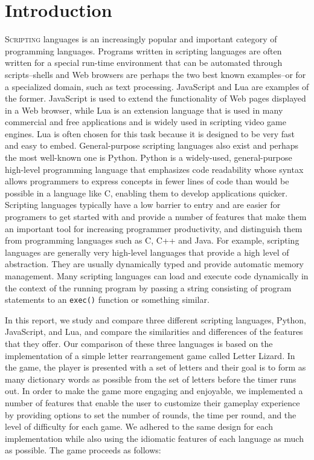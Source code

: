 \section{Introduction}

\lettrine[nindent=0em,lines=3]{S}{cripting} languages is an increasingly popular and important
category of programming languages. Programs written in scripting languages are often written for
a special run-time environment that can be automated through scripts--shells and Web browsers
are perhaps the two best known examples--or for a specialized domain, such as text processing.
JavaScript and Lua are examples of the former. JavaScript is used to extend the functionality
of Web pages displayed in a Web browser, while Lua is an extension language that is used in many 
commercial and free applications and is widely used in scripting video game engines. Lua is
often chosen for this task because it is designed to be very fast and easy to embed.
General-purpose scripting languages also exist and perhaps the most well-known one is Python.
Python is a widely-used, general-purpose high-level programming language that emphasizes code
readability whose syntax allows programmers to express concepts in fewer lines of code than would be 
possible in a language like C, enabling them to develop applications quicker. 
Scripting languages typically have a low barrier to entry and are easier for programers to 
get started with and provide a number of features that make them an important tool for increasing 
programmer productivity, and distinguish them from programming languages such as C, C++ and Java. 
For example, scripting languages are generally very high-level languages that provide a high level of 
abstraction. They are usually dynamically typed and provide automatic memory management. Many
scripting languages can load and execute code dynamically in the context of the running program
by passing a string consisting of program statements to an \texttt{exec()} function or something
similar.

In this report, we study and compare three different scripting languages, Python,
JavaScript, and Lua, and compare the similarities and differences of the features that
they offer. Our comparison of these three languages
is based on the implementation of a simple letter rearrangement game
called Letter Lizard. In the game, the player is presented with a set of letters and 
their goal is to form as many dictionary words as possible from the set of letters
before the timer runs out. In order to make the game
more engaging and enjoyable, we implemented a number of features that enable the user to customize
their gameplay experience by providing options to set the number of rounds, the time per round, 
and the level of difficulty for each
game.
We adhered to the same
design for each implementation while also using the idiomatic features of each language as much as 
possible. The game proceeds as follows:

